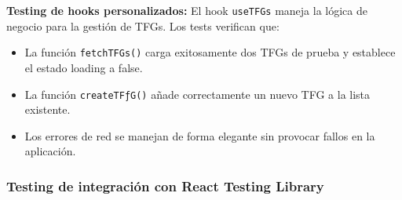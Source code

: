 \documentclass[12pt,a4paper,oneside]{report}
\begin{document}
\textbf{Testing de hooks personalizados:} El hook \texttt{useTFGs} maneja la lógica de negocio para la gestión de TFGs. Los tests verifican que:
\begin{itemize}
\item La función \texttt{fetchTFGs()} carga exitosamente dos TFGs de prueba y establece el estado loading a false.
\item La función \texttt{createTFƒG()} añade correctamente un nuevo TFG a la lista existente.
\item Los errores de red se manejan de forma elegante sin provocar fallos en la aplicación.
\end{itemize}

\subsubsection{Testing de integración con React Testing
Library}\label{testing-de-integraciuxf3n-con-react-testing-library}
\end{document}
